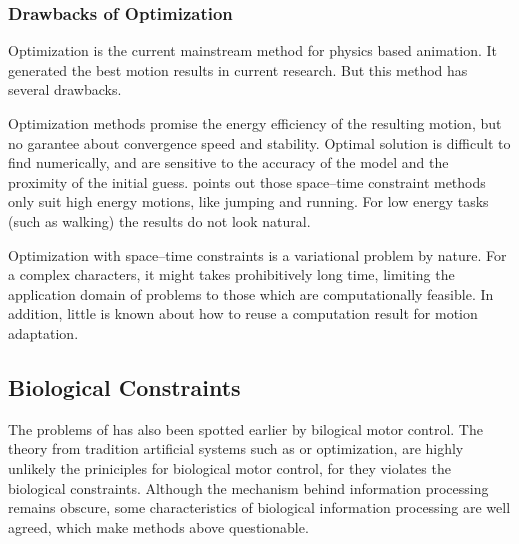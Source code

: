 \subsubsection*{Drawbacks of Optimization}
Optimization is the current mainstream method for physics based animation.
It generated the best motion results in current research.
But this method has several drawbacks.

\begin{itemize}
Optimization methods promise the energy efficiency of the resulting motion, but no garantee about convergence speed and stability.
Optimal solution is difficult to find numerically, and are sensitive to the accuracy of the model and the proximity of the initial guess.
\citet{Liu2005} points out those space–time constraint methods only suit high energy motions, like jumping and running.
For low energy tasks (such as walking) the results do not look natural.

Optimization with space–time constraints is a variational problem by nature. 
For a complex characters, it might takes  prohibitively long time, limiting the application domain of problems to those which are computationally feasible. 
In addition, little is known about how to reuse a computation result for motion adaptation.

\end{itemize}


\subsection{Biological Constraints}
The problems of \cms has also been spotted earlier by bilogical motor control.
The theory from tradition artificial systems such as \pd or optimization, are highly unlikely the priniciples for biological motor control, for they  violates the biological constraints.
Although the mechanism behind information processing remains obscure, some characteristics of biological information processing are well agreed, which make  \cms methods above questionable\citep{Glynn2003}. 
  
